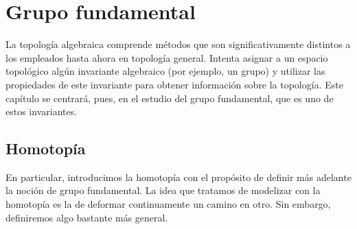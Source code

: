\chapter{Grupo fundamental}
\label{grf}

La topología algebraica comprende métodos que son significativamente distintos a los empleados hasta ahora en topología general. Intenta asignar a un espacio topológico algún invariante algebraico (por ejemplo, un grupo) y utilizar las propiedades de este invariante para obtener información sobre la topología. Este capítulo se centrará, pues, en el estudio del grupo fundamental, que es uno de estos invariantes.

\section{Homotopía}

En particular, introducimos la homotopía con el propósito de definir más adelante la noción de grupo fundamental. La idea que tratamos de modelizar con la homotopía es la de deformar continuamente un camino en otro. Sin embargo, definiremos algo bastante más general. 

